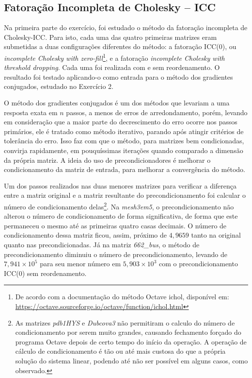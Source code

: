 \documentclass{article}
\begin{document}
\subsection{Fatoração Incompleta de Cholesky -- ICC}

Na primeira parte do exercício, foi estudado o método da fatoração incompleta de Cholesky-ICC. Para isto, cada uma das quatro primeiras matrizes eram submetidas a duas configurações diferentes do método: a fatoração ICC(0), ou \textit{incomplete Cholesky with zero-fill}\footnote{De acordo com a documentação do método Octave ichol, disponível em: \href{https://octave.sourceforge.io/octave/function/ichol.html}{https://octave.sourceforge.io/octave/function/ichol.html}}, e a fatoração \textit{incomplete Cholesky with threshold dropping}. Cada uma foi realizada com e sem reordenamento. O resultado foi testado aplicando-o como entrada para o método dos gradientes conjugados, estudado no Exercício 2.

O método dos gradientes conjugados é um dos métodos que levariam a uma resposta exata em $n$ passos, a menos de erros de arredondamento, porém, levando em consideração que a maior parte do decrescimento do erro ocorre nos passos primários, ele é tratado como método iterativo, parando após atingir critérios de tolerância do erro. Isso faz com que o método, para matrizes bem condicionadas, convirja rapidamente, em pouquíssimas iterações quando comparado a dimensão da própria matriz. A ideia do uso de precondicionadores é melhorar o condicionamento da matriz de entrada, para melhorar a convergência do método.

Um dos passos realizados nas duas menores matrizes para verificar a diferença entre a matriz original e a matriz resultante do precondicionamento foi calcular o número de condicionamento delas\footnote{As matrizes \textit{pdb1HYS} e \textit{Dubcova3} não permitiram o calculo do número de condicionamento por serem muito grandes, causando fechamento forçado do programa Octave depois de certo tempo do início da operação. A operação de cálculo de condicionamento é tão ou até mais custosa do que a própria solução do sistema linear, podendo até não ser possível em alguns casos, como observado.}. Na \textit{mesh3em5}, o precondicionamento não alterou o número de condicionamento de forma significativa, de forma que este permaneceu o mesmo até as primeiras quatro casas decimais. O número de condicionamento dessa matriz ficou, assim, próximo de $4,9659$ tanto na original quanto nas precondicionadas. Já na matriz \textit{662\_bus}, o método de precondicionamento diminuiu o número de precondicionamento, levando de $7,941\times 10^5$ para seu menor número em $5,903\times 10^3$ com o precondicionamento ICC(0) sem reordenamento.
\end{document}
